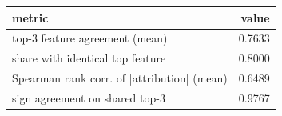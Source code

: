\begin{tabular}{lr}
\toprule
metric & value \\
\midrule
top-3 feature agreement (mean) & 0.7633 \\
share with identical top feature & 0.8000 \\
Spearman rank corr. of |attribution| (mean) & 0.6489 \\
sign agreement on shared top-3 & 0.9767 \\
\bottomrule
\end{tabular}
